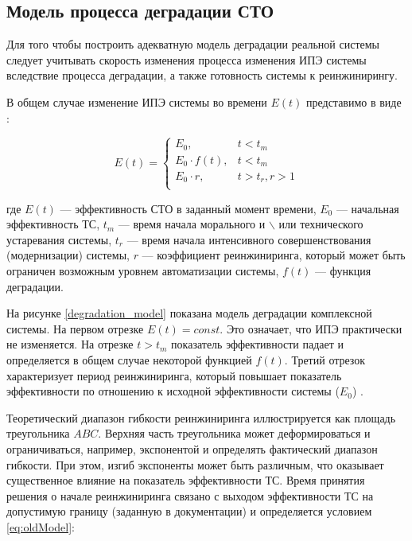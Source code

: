 \subsection{Модель процесса деградации СТО}
Для того чтобы построить адекватную модель деградации реальной системы следует учитывать скорость изменения процесса изменения ИПЭ системы вследствие процесса деградации, а также готовность системы к реинжинирингу. 

В общем случае изменение ИПЭ системы во времени $E(t)$ представимо в виде \cite{Doronina}:

\begin{equation} \label{eq:oldModel}
    E(t) = \begin{cases}
        E_0,            &  t<t_m         \\
        E_0 \cdot f(t), &  t<t_m         \\
        E_0 \cdot r,          &  t>t_r, r>1 \\
    \end{cases}
\end{equation}
\vspace{\baselineskip}

\noindent
где $E(t)$ --- эффективность СТО в заданный момент времени,
$E_0$ --- начальная эффективность ТС, 
$t_m$ --- время начала морального и $\backslash$ или технического устаревания системы,
$t_r$ --- время начала интенсивного совершенствования (модернизации) системы,
$r$ --- коэффициент реинжиниринга, который может быть ограничен возможным уровнем автоматизации системы,
$f(t)$ --- функция деградации.

На рисунке \ref{degradation_model} показана модель деградации комплексной системы. 
На первом отрезке $E(t) = const$. 
Это означает, что ИПЭ практически не изменяется. 
На отрезке $t > t_m$ показатель эффективности падает и определяется в общем случае некоторой функцией $f(t)$. 
Третий отрезок характеризует период реинжиниринга, который повышает показатель эффективности по отношению к исходной эффективности системы ($E_0$) \cite{Doronina}.


Теоретический диапазон гибкости реинжиниринга иллюстрируется как площадь треугольника $ABC$. 
Верхняя часть треугольника может деформироваться и ограничиваться, например, экспонентой и определять фактический диапазон гибкости. 
При этом, изгиб экспоненты может быть различным, что оказывает существенное влияние на показатель эффективности ТС. 
Время принятия решения о начале реинжиниринга связано с выходом эффективности ТС на допустимую границу (заданную в документации) и определяется условием \ref{eq:oldModel}:

